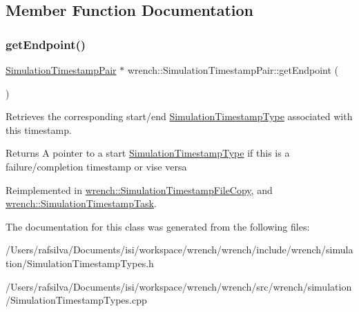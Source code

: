 \subsection{Member Function Documentation}
\mbox{\label{classwrench_1_1_simulation_timestamp_pair_aa47d05297b863c29179a505ea4e5dfdf}} 
\subsubsection{\texorpdfstring{get\+Endpoint()}{getEndpoint()}}
{\footnotesize\ttfamily \hyperlink{classwrench_1_1_simulation_timestamp_pair}{Simulation\+Timestamp\+Pair} $\ast$ wrench\+::\+Simulation\+Timestamp\+Pair\+::get\+Endpoint (\begin{DoxyParamCaption}{ }\end{DoxyParamCaption})\hspace{0.3cm}{\ttfamily [virtual]}}



Retrieves the corresponding start/end \hyperlink{classwrench_1_1_simulation_timestamp_type}{Simulation\+Timestamp\+Type} associated with this timestamp. 

\begin{DoxyReturn}{Returns}
A pointer to a start \hyperlink{classwrench_1_1_simulation_timestamp_type}{Simulation\+Timestamp\+Type} if this is a failure/completion timestamp or vise versa 
\end{DoxyReturn}


Reimplemented in \hyperlink{classwrench_1_1_simulation_timestamp_file_copy_a2cd940b53a294459ebcab5bce823c9a0}{wrench\+::\+Simulation\+Timestamp\+File\+Copy}, and \hyperlink{classwrench_1_1_simulation_timestamp_task_af8e8da0d1710e20f4e517852c53cb1f2}{wrench\+::\+Simulation\+Timestamp\+Task}.



The documentation for this class was generated from the following files\+:\begin{DoxyCompactItemize}
\item 
/\+Users/rafsilva/\+Documents/isi/workspace/wrench/wrench/include/wrench/simulation/Simulation\+Timestamp\+Types.\+h\item 
/\+Users/rafsilva/\+Documents/isi/workspace/wrench/wrench/src/wrench/simulation/Simulation\+Timestamp\+Types.\+cpp\end{DoxyCompactItemize}
